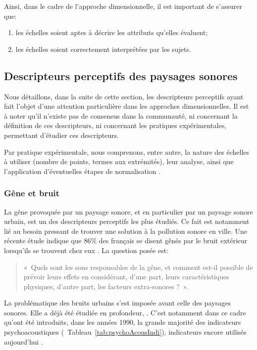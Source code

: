 Ainsi, dans le cadre de l'approche dimensionnelle, il est important de s'assurer que:

\begin{enumerate}
\item les échelles soient aptes à décrire les attributs qu'elles évaluent;
\item les échelles soient correctement interprétées par les sujets.
\end{enumerate}

\subsection{Descripteurs perceptifs des paysages sonores}
\label{sec:descripteursPercetifs}

Nous détaillons, dans la suite de cette section, les descripteurs perceptifs ayant fait l'objet d'une attention particulière dans les approches dimensionnelles. Il est à noter qu'il n'existe pas de consensus dans la communauté, ni concernant la définition de ces descripteurs, ni concernant les pratiques expérimentales, permettant d'étudier ces descripteurs.

Par pratique expérimentale, nous comprenons, entre autre, la nature des échelles à utiliser (nombre de points, termes aux extrémités), leur analyse, ainsi que l'application d'éventuelles étapes de normalisation \citep{aletta2016soundscape}.

\subsubsection{Gêne et bruit}

La gêne provoquée par un paysage sonore, et en particulier par un paysage sonore urbain, est un des descripteurs perceptifs les plus étudiés. Ce fait est notamment lié au besoin pressant de trouver une solution à la pollution sonore en ville. Une récente étude indique que 86\% des français se disent gênés par le bruit extérieur lorsqu'ils se trouvent chez eux \citep{noiseFrench}. La question posée est: \\

\begin{quote}
«~Quels sont les sons responsables de la gêne, et comment est-il possible de prévoir leurs effets en considérant, d'une part, leurs caractéristiques physiques, d'autre part, les facteurs extra-sonores ?~».
\end{quote}

La problématique des bruits urbains s'est imposée avant celle des paysages sonores. Elle a déjà été étudiée en profondeur, \citep{marquis2005noisea,marquis2005noiseb}. C'est notamment dans ce cadre qu'ont été introduits, dans les années 1990, la grande majorité des indicateurs psychoacoustiques \citep{zwicker2013psychoacoustics}(\cf~Tableau~\ref{tab:psychoAcousIndi}), indicateurs encore utilisés aujourd'hui \citep{hall2013exploratory,fiebig2009psychoacoustic,yang2013psychoacoustical}.

